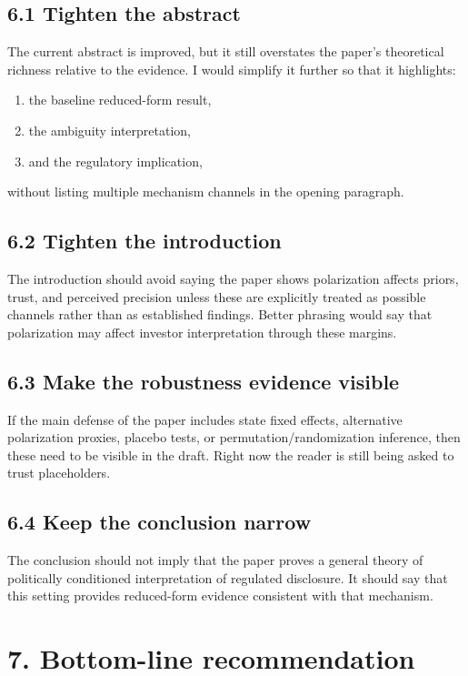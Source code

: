 \documentclass[11pt]{article}
\begin{document}
\subsection*{6.1 Tighten the abstract}

The current abstract is improved, but it still overstates the paper's theoretical richness relative to the evidence. I would simplify it further so that it highlights:
\begin{enumerate}[leftmargin=1.5em]
    \item the baseline reduced-form result,
    \item the ambiguity interpretation,
    \item and the regulatory implication,
\end{enumerate}
without listing multiple mechanism channels in the opening paragraph.

\subsection*{6.2 Tighten the introduction}

The introduction should avoid saying the paper shows polarization affects priors, trust, and perceived precision unless these are explicitly treated as possible channels rather than as established findings. Better phrasing would say that polarization may affect investor interpretation through these margins.

\subsection*{6.3 Make the robustness evidence visible}

If the main defense of the paper includes state fixed effects, alternative polarization proxies, placebo tests, or permutation/randomization inference, then these need to be visible in the draft. Right now the reader is still being asked to trust placeholders.

\subsection*{6.4 Keep the conclusion narrow}

The conclusion should not imply that the paper proves a general theory of politically conditioned interpretation of regulated disclosure. It should say that this setting provides reduced-form evidence consistent with that mechanism.

\section*{7. Bottom-line recommendation}
\end{document}

